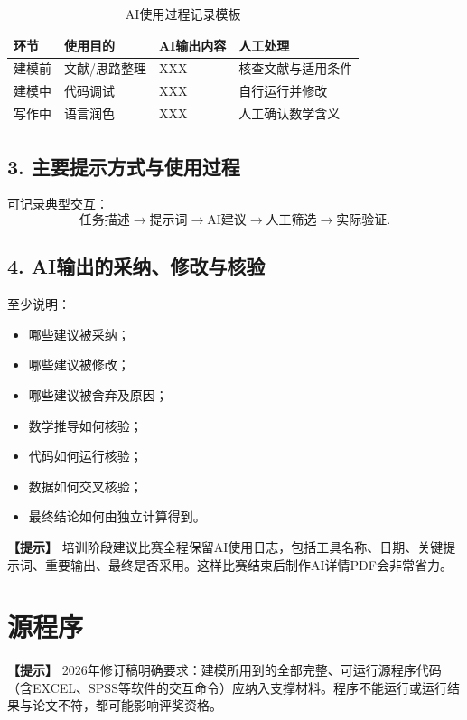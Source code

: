 \documentclass[12pt,a4paper]{article}
\newcommand{\tip}[1]{\par\noindent\textbf{【提示】} #1\par}
\begin{document}
\begin{table}[H]
\centering
\caption{AI使用过程记录模板}
\begin{tabular}{p{2.2cm}p{3.5cm}p{3cm}p{5cm}}
\toprule
环节 & 使用目的 & AI输出内容 & 人工处理 \\
\midrule
建模前 & 文献/思路整理 & XXX & 核查文献与适用条件 \\
建模中 & 代码调试 & XXX & 自行运行并修改 \\
写作中 & 语言润色 & XXX & 人工确认数学含义 \\
\bottomrule
\end{tabular}
\end{table}

\subsection*{3. 主要提示方式与使用过程}
可记录典型交互：
\[
\text{任务描述}\rightarrow\text{提示词}\rightarrow\text{AI建议}\rightarrow\text{人工筛选}\rightarrow\text{实际验证}.
\]

\subsection*{4. AI输出的采纳、修改与核验}
至少说明：
\begin{itemize}
  \item 哪些建议被采纳；
  \item 哪些建议被修改；
  \item 哪些建议被舍弃及原因；
  \item 数学推导如何核验；
  \item 代码如何运行核验；
  \item 数据如何交叉核验；
  \item 最终结论如何由独立计算得到。
\end{itemize}

\tip{培训阶段建议比赛全程保留AI使用日志，包括工具名称、日期、关键提示词、重要输出、最终是否采用。这样比赛结束后制作AI详情PDF会非常省力。}

\section{源程序}

\tip{2026年修订稿明确要求：建模所用到的全部完整、可运行源程序代码（含EXCEL、SPSS等软件的交互命令）应纳入支撑材料。程序不能运行或运行结果与论文不符，都可能影响评奖资格。}
\end{document}
